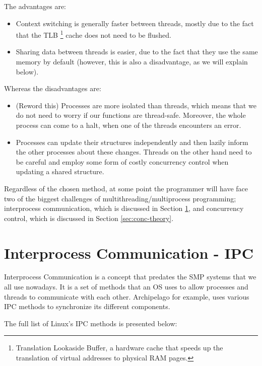 The advantages are:

\begin{itemize}
	\item Context switching is generally faster between threads, mostly due 
		to the fact that the TLB
		\footnote{Translation Lookaside Buffer, a hardware cache that speeds up 
			the translation of virtual addresses to physical RAΜ pages.}
		cache does not need to be flushed.
	\item Sharing data between threads is easier, due to the fact that they use 
		the same memory by default (however, this is also a 
		disadvantage, as we will explain below).
\end{itemize}

Whereas the disadvantages are:

\begin{itemize}
	\item (\fixme Reword this) Processes are more isolated than threads, 
		which means that we do not need to worry if our functions are 
		thread-safe.  Moreover, the whole process can come to a halt, 
		when one of the threads encounters an error.
	\item Processes can update their structures independently and then lazily 
		inform the other processes about these changes. Threads on the other 
		hand need to be careful and employ some form of costly 
		concurrency control when updating a shared structure.
\end{itemize}

Regardless of the chosen method, at some point the programmer will have face 
two of the biggest challenges of multithreading/multiprocess programming;
interprocess communication, which is discussed in Section \ref{sec:ipc-theory}, 
and concurrency control, which is discussed in Section \ref{sec:conc-theory}.

\section{Interprocess Communication - IPC}\label{sec:ipc-theory}

Interprocess Communication is a concept that predates the SMP systems that we 
all use nowadays. It is a set of methods that an OS uses to allow processes and 
threads to communicate with each other. Archipelago for example, uses various 
IPC methods to synchronize its different components.

The full list of Linux's IPC methods is presented below:

